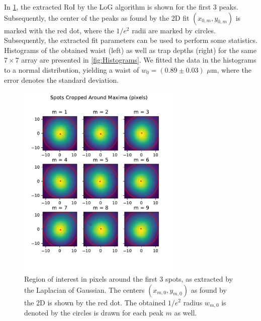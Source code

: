 In \cref{fig:SpotsRoI}, the extracted \ac{RoI} by the \ac{LoG} algorithm is shown for the first 3 peaks. 
Subsequently, the center of the peaks as found by the 2D fit $(x_{0,m},y_{0,m})$ is marked with the red dot, where the $1/e^2$ radii are marked by circles. 
Subsequently, the extracted fit parameters can be used to perform some statistics.
Histograms of the obtained waist (left) as well as trap depths (right) for the same $7\times7$ array are presented in \cref{fig:Histograms}.
We fitted the data in the histograms to a normal distribution, yielding a waist of $w_0 = (0.89 \pm 0.03)$ $\mu$m, where the error denotes the standard deviation.

\begin{figure}
    \centering
    \includegraphics[width=0.7\textwidth]{figures/SpotsCropped_range12.pdf}
    \caption{Region of interest in pixels around the first 3 spots, as extracted by the Laplacian of Gaussian. 
    The centers $(x_{m,0},y_{m,0})$ as found by the 2D is shown by the red dot. 
    The obtained $1/e^2$ radius $w_{m,0}$ is denoted by the circles is drawn for each peak $m$ as well.}
    \label{fig:SpotsRoI}
\end{figure}



